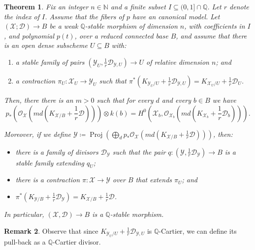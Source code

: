 \documentclass{amsart}
\newcommand{\bQ}{\mathbb{Q}}
\newcommand{\cD}{\mathcal{D}}
\newcommand{\cO}{\mathcal{O}}
\newcommand{\cX}{\mathcal{X}}
\newcommand{\cY}{\mathcal{Y}}
\newtheorem{theorem}{Theorem}[section]
\theoremstyle{definition}
\newtheorem{Remark}[theorem]{Remark}
\newcommand{\rar}{\rightarrow}
\begin{document}
\begin{theorem}\label{thm_morphism_our_stack_to_kollars_one_for_reduced_bases}
Fix an integer $n\in \mathbb{N}$ and a finite subset $I\subseteq (0,1] \cap \mathbb{Q}$.
Let $r$ denote the index of $I$.
Assume that the fibers of $p$ have an canonical model.
Let $(\cX;\cD)\to B$ be a weak $\bQ$-stable morphism of dimension $n$, with coefficients in $I$, and polynomial $p(t)$, over a reduced connected base $B$, and assume that there is an open dense subscheme $U\subseteq B$ with:
\begin{enumerate}
    \item a stable family of pairs $(\cY_U,\frac{1}{r}\cD_{\cY,U})\to U$ of relative dimension $n$; and
    \item a contraction $\pi_U \colon \cX_U\to \cY_U $ such that $\pi^*(K_{\cY_U/U} + \frac{1}{r}\cD_{\cY,U}) = K_{\cX_U/U} + \frac{1}{r}\cD_{U}$.
\end{enumerate}
Then, there there is an $m>0$ such that for every $d$ and every $b\in B$ we have $$p_*(\cO_{\cX}(md(K_{\cX/B}+\frac{1}{r}\cD)))\otimes k(b) = H^0(\cX_b, \cO_{\cX_b}(md(K_{\cX_b}+\frac{1}{r}\cD_b))) .$$

Moreover, if we define $\cY \coloneqq \operatorname{Proj}(\bigoplus_d p_*\cO_{\cX}(md(K_{\cX/B}+\frac{1}{r}\cD)))$, then:
\begin{itemize}
    \item there is a family of divisors $\cD_\cY$ such that the pair $q \colon  (\cY,\frac{1}{r}\cD_\cY) \to B $ is a stable family extending $q_U$;
    \item there is a contraction $\pi \colon \cX\to \cY$ over $B$ that extends $\pi_U$; and
    \item $\pi^*(K_{\cY/B} + \frac{1}{r}\cD_{\cY}) = K_{\cX/B} + \frac{1}{r}\cD$.
\end{itemize}
In particular, $(\mathcal X, \mathcal{D}) \rar B$ is a $\bQ$-stable morphism.
\end{theorem}
\begin{Remark}
Observe that since $K_{\cY_U/U} + \frac{1}{r}\cD_{\cY,U}$ is $\bQ$-Cartier, we can define its pull-back as a $\bQ$-Cartier divisor. 
\end{Remark}
\end{document}
